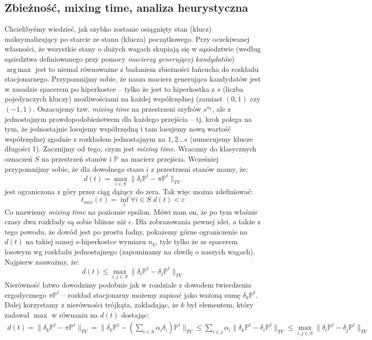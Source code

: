 \documentclass[a4paper]{article}
\DeclareMathOperator*{\argmax}{arg\,max}
\begin{document}
\subsection{Zbieżność, mixing time, analiza heurystyczna}
Chcielibyśmy wiedzieć, jak szybko zostanie osiągnięty stan (klucz) maksymalizujący po starcie ze stanu (klucza) początkowego. Przy oczekiwanej własności, że wszystkie stany o dużych wagach skupiają się w sąsiedztwie (według sąsiedztwa definiowanego przy pomocy \textit{macierzy generującej kandydatów}) $\argmax$ jest to niemal równoważne z badaniem zbieżności łańcucha do rozkładu stacjonarnego. Przypomnijmy sobie, że nasza macierz generująca kandydatów jest w zasadzie spacerem po hiperkostce – tylko że jest to hiperkostka z $s$ (liczba pojedynczych kluczy) możliwościami na każdej współrzędnej (zamiast $(0,1)$ czy $(-1,1)$. Oszacujemy tzw. \textit{mixing time} na przestrzeni szyfrów $s^{n_k}$, ale z jednostajnym prawdopodobieństwem dla każdego przejścia – tj. krok polega na tym, że jednostajnie losujemy współrzędną i tam losujemy nową wartość współrzędnej zgodnie z rozkładem jednostajnym na $1,2...s$ (numerujemy klucze długości 1). Zacznijmy od tego, czym jest \textit{mixing time}. Wracamy do klasycznych oznaczeń $S$ na przestrzeń stanów i $\mathbb{P}$ na macierz przejścia. Wcześniej przypomnijmy sobie, że dla dowolnego stanu $i$ z przestrzeni stanów mamy, że:
$$d(t) = \max_{i \in S} \|\delta_i \mathbb{P}^t - \pi \mathbb{P}^t\|_{TV}$$
jest ograniczona z góry przez ciąg dążący do zera. Tak więc można zdefiniować:
$$ t_{mix}(\varepsilon) = \inf_t \forall i \in S\,\, d(t) < \varepsilon$$
Co nazwiemy \textit{mixing time} na poziomie epsilon. Mówi nam on, że po tym właśnie czasy dwa rozkłady są sobie bliższe niż $\epsilon$. Dla zobrazowania pewnej idei, a także z tego powodu, że dowód jest po prostu ładny, pokażemy górne ograniczenie na $d(t)$ na takiej samej $s$-hiperkostce wymiaru $n_k$, tyle tylko że ze spacerem losowym wg rozkładu jednostajnego (zapominamy na chwilę o naszych wagach). Najpierw zauważmy, że:
$$d(t) \leq \max_{i,j \in S} \|\delta_i \mathbb{P}^t - \delta_j \mathbb{P}^t \|_{TV}$$
Nierówność łatwo dowodzimy podobnie jak w rozdziale z dowodem twierdzenia ergodycznego $\pi\mathbb{P}^t$ – rozkład stacjonarny możemy zapisać jako ważoną sumę $\delta_k \mathbb{P}^t$. Dalej korzystamy z nierówności trójkąta, zakładając, że $k$ był elementem, który zadawał $\max$ w równaniu na $d(t)$ dostając:
\begin{align*}
d(t) = \|\delta_k \mathbb{P}^t - \pi \mathbb{P}^t\|_{TV} = \|\delta_k \mathbb{P}^t - (\sum\limits_{i \in S} \alpha_i \delta_i) \mathbb{P}^t\|_{TV} \leq \sum\limits_{i \in j} \alpha_i \|\delta_k \mathbb{P}^t - \delta_i \mathbb{P}^t\|_{TV} \leq \max_{i,j \in S} \|\delta_i \mathbb{P}^t - \delta_j \mathbb{P}^t \|_{TV}
\end{align*}
\end{document}

